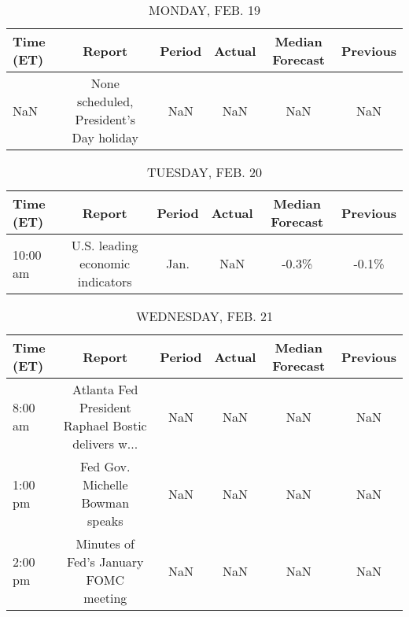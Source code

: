 \documentclass{article}%
\begin{document}
%
\normalsize%


\begin{table}[htbp]%
\caption{MONDAY, FEB. 19}%
\centering%
\begin{adjustbox}{width=1\textwidth}%
\begin{tabular}{lccccc}
\toprule
Time (ET) &                                  Report & Period & Actual & Median Forecast & Previous \\
\midrule
      NaN & None scheduled, President's Day holiday &    NaN &    NaN &             NaN &      NaN \\
\bottomrule
\end{tabular}
%
\end{adjustbox}%
\end{table}

%


\begin{table}[htbp]%
\caption{TUESDAY, FEB. 20}%
\centering%
\begin{adjustbox}{width=1\textwidth}%
\begin{tabular}{lccccc}
\toprule
Time (ET) &                           Report & Period & Actual & Median Forecast & Previous \\
\midrule
 10:00 am & U.S. leading economic indicators &   Jan. &    NaN &           -0.3\% &    -0.1\% \\
\bottomrule
\end{tabular}
%
\end{adjustbox}%
\end{table}

%


\begin{table}[htbp]%
\caption{WEDNESDAY, FEB. 21}%
\centering%
\begin{adjustbox}{width=1\textwidth}%
\begin{tabular}{lccccc}
\toprule
Time (ET) &                                             Report & Period & Actual & Median Forecast & Previous \\
\midrule
  8:00 am & Atlanta Fed President Raphael Bostic delivers w... &    NaN &    NaN &             NaN &      NaN \\
  1:00 pm &                    Fed Gov. Michelle Bowman speaks &    NaN &    NaN &             NaN &      NaN \\
  2:00 pm &              Minutes of Fed's January FOMC meeting &    NaN &    NaN &             NaN &      NaN \\
\bottomrule
\end{tabular}
%
\end{adjustbox}%
\end{table}
\end{document}
